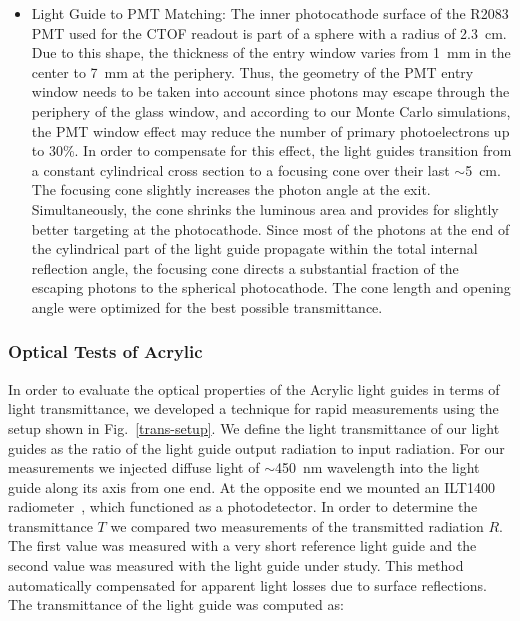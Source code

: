\documentclass{elsart}
\begin{document}
\begin{itemize}
\item Light Guide to PMT Matching: The inner photocathode surface of the R2083 PMT used for
the CTOF readout is part of a sphere with a radius of 2.3~cm. Due to this shape, the thickness of the
entry window varies from 1~mm in the center to 7~mm at the periphery. Thus, the geometry of the
PMT entry window needs to be taken into account since photons may escape through the periphery
of the glass window, and according to our Monte Carlo simulations, the PMT window effect may
reduce the number of primary photoelectrons up to 30\%. In order to compensate for this effect,
the light guides transition from a constant cylindrical cross section to a focusing cone over their last 
$\sim$5~cm. The focusing cone slightly increases the photon angle at the exit. Simultaneously, 
the cone shrinks the luminous area and provides for slightly better targeting at the photocathode. 
Since most of the photons at the end of the cylindrical part of the light guide propagate within 
the total internal reflection angle, the focusing cone directs a substantial fraction of the 
escaping photons to the spherical photocathode. The cone length and opening angle were optimized 
for the best possible transmittance. 

\end{itemize}

\subsubsection{Optical Tests of Acrylic}
\label{optical-tests}
  
In order to evaluate the optical properties of the Acrylic light guides in terms of light
transmittance, we developed a technique for rapid measurements using the setup shown in 
Fig.~\ref{trans-setup}. We define the light transmittance of our light guides as the ratio 
of the light guide output radiation to input radiation. For our measurements we injected 
diffuse light of $\sim$450~nm wavelength into the light guide along its axis from one end. 
At the opposite end we mounted an ILT1400 radiometer~\cite{ilt-ref}, which functioned as a
photodetector. In order to determine the transmittance $T$ we compared two measurements
of the transmitted radiation $R$. The first value was measured with a very short reference
light guide and the second value was measured with the light guide under study. This method
automatically compensated for apparent light losses due to surface reflections. The transmittance
of the light guide was computed as:  
\end{document}
